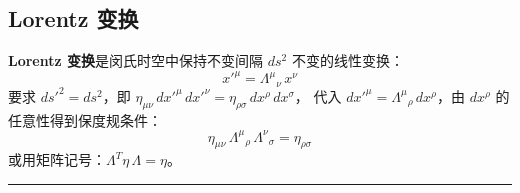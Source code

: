 \subsection{Lorentz 变换}
\textbf{Lorentz 变换}是闵氏时空中保持不变间隔 $ds^2$ 不变的线性变换：
\begin{equation}\label{eq:Lorentz-def}
  x'^\mu = \Lambda^\mu{}_\nu\, x^\nu
\end{equation}
要求 $ds'^2 = ds^2$，即 $\eta_{\mu\nu}\,dx'^\mu\,dx'^\nu = \eta_{\rho\sigma}\,dx^\rho\,dx^\sigma$，
代入 $dx'^\mu = \Lambda^\mu{}_\rho\,dx^\rho$，由 $dx^\rho$ 的任意性得到保度规条件：
\begin{equation}\label{eq:metric-preserve}
  \eta_{\mu\nu}\,\Lambda^\mu{}_\rho\,\Lambda^\nu{}_\sigma = \eta_{\rho\sigma}
\end{equation}或用矩阵记号：$\Lambda^T \eta\,\Lambda = \eta$。
\vspace{2ex}\hrule
\vspace{2ex}

